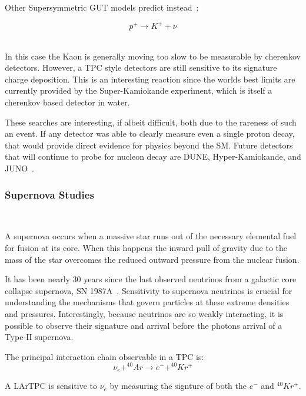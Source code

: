 Other Supersymmetric GUT models predict instead~\citep{PhysRevD.38.1479}:

\begin{equation}
  p^{+} \rightarrow K^{+} + \nu
\end{equation}
~\label{eq:rxn_proton_decay2}

In this case the Kaon is generally moving too slow to be measurable by cherenkov detectors.
However, a TPC style detectors are still sensitive to its signature charge deposition.
This is an interesting reaction since the worlds best limits are currently provided by the Super-Kamiokande experiment, which is itself a cherenkov based detector in water.

These searches are interesting, if albeit difficult, both due to the rareness of such an event.
If any detector was able to clearly measure even a single proton decay, that would provide direct evidence for physics beyond the SM.
Future detectors that will continue to probe for nucleon decay are DUNE, Hyper-Kamiokande, and JUNO~\citep{DUNE_TDR_V1_Abi_2020, https://doi.org/10.48550/arxiv.1805.04163, Juno:2022103927}.

\subsubsection{Supernova Studies}~\label{sec:intro_supernova}

A supernova occurs when a massive star runs out of the necessary elemental fuel for fusion at its core.
When this happens the inward pull of gravity due to the mass of the star overcomes the reduced outward pressure from the nuclear fusion.

It has been nearly 30 years since the last observed neutrinos from a galactic core collapse supernova, SN 1987A~\citep{1987ApJ...322..795F}.
Sensitivity to supernova neutrinos is crucial for understanding the mechanisms that govern particles at these extreme densities and pressures.
Interestingly, because neutrinos are so weakly interacting, it is possible to observe their signature and arrival before the photons arrival of a Type-II supernova.

The principal interaction chain observable in a TPC is:
\begin{equation}
    \nu_{e} + ^{40}Ar \rightarrow e^- + ^{40}Kr^{+}
\end{equation}

A LArTPC is sensitive to $\nu_{e}$ by measuring the signture of both the $e^{-}$ and $^{40}Kr^{+}$.


